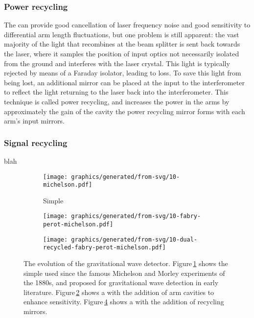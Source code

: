 \subsubsection{Power recycling}
The \FPMI{} can provide good cancellation of laser frequency noise and good sensitivity to differential arm length fluctuations, but one problem is still apparent: the vast majority of the light that recombines at the beam splitter is sent back towards the laser, where it samples the position of input optics not necessarily isolated from the ground and interferes with the laser crystal. This light is typically rejected by means of a Faraday isolator, leading to loss. To save this light from being lost, an additional mirror can be placed at the input to the interferometer to reflect the light returning to the laser back into the interferometer. This technique is called power recycling, and increases the power in the arms by approximately the gain of the cavity the power recycling mirror forms with each arm's input mirrors.

\subsubsection{Signal recycling}
blah

\begin{figure}
  \begin{center}
    \begin{subfigure}{.3\textwidth}
      \texttt{[image: graphics/generated/from-svg/10-michelson.pdf]}
      \caption{Simple \MI{}}
      \label{fig:mi}
    \end{subfigure}
    \hfill
    \begin{subfigure}{.3\textwidth}
      \texttt{[image: graphics/generated/from-svg/10-fabry-perot-michelson.pdf]}
      \caption{\FPMI{}}
      \label{fig:fpmi}
    \end{subfigure}
    \hfill
    \begin{subfigure}{.3\textwidth}
      \texttt{[image: graphics/generated/from-svg/10-dual-recycled-fabry-perot-michelson.pdf]}
      \caption{\DRFPMI{}}
      \label{fig:drfpmi}
    \end{subfigure}
    \caption[The evolution of the gravitational wave detector]{The evolution of the gravitational wave detector. Figure\,\ref{fig:mi} shows the simple \MI{} used since the famous Michelson and Morley experiments of the 1880s, and proposed for gravitational wave detection in early literature. Figure\,\ref{fig:fpmi} shows a \MI{} with the addition of \FP{} arm cavities to enhance sensitivity. Figure\,\ref{fig:drfpmi} shows a \FPMI{} with the addition of recycling mirrors.}
  \end{center}
\end{figure}

